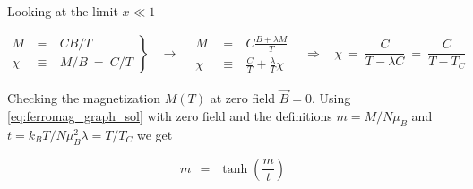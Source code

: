 \documentclass[10pt]{report}
\numberwithin{equation}{chapter}
\begin{document}
Looking at the limit $ x \ll 1$ 

\begin{equation*}
  \left.
  \begin{array}{lcr}
    M ~ & = &~ C B/T \\
    \chi ~ & \equiv &~ M/B ~=~ C/T
  \end{array} \right\} 
  ~~~~ \rightarrow ~~~~ 
  \begin{array}{lcr}
    M ~~&=& ~ C \frac{B + \lambda M}{T}\\
    \chi ~ &\equiv& ~ \frac{C}{T} + \frac{\lambda}{T} \chi
  \end{array}
  ~~~~ \Rightarrow ~~~~ 
  \chi ~=~ \frac{C}{T-\lambda C} ~=~ \frac{C}{T - T_C}
\end{equation*}


Checking the magnetization $M(T)$ at zero field $\vec{B} = 0$. Using \ref{eq:ferromag_graph_sol} with zero field and the definitions $m = M/N \mu_B$ and $t = k_BT/N \mu_B^2 \lambda = T/T_C$ we get

\begin{equation}
  m ~~=~~ \tanh(\frac{m}{t})
\end{equation}
\end{document}
